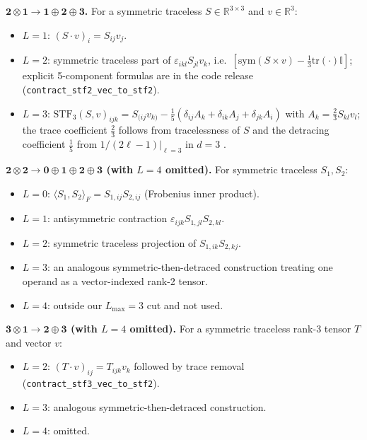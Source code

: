 \textbf{$\mathbf{2} \otimes \mathbf{1} \to \mathbf{1} \oplus \mathbf{2} \oplus \mathbf{3}$.}
For a symmetric traceless $S \in \mathbb{R}^{3\times 3}$ and $v \in \mathbb{R}^3$:
\begin{itemize}
    \item $L{=}1$: $(S \cdot v)_i = S_{ij}v_j$.
    \item $L{=}2$: symmetric traceless part of $\varepsilon_{ikl}S_{jl}v_k$, i.e.\ $[\mathrm{sym}(S\times v) - \tfrac{1}{3}\mathrm{tr}(\cdot)\mathbb{I}]$; explicit 5-component formulas are in the code release (\texttt{contract\_stf2\_vec\_to\_stf2}).
    \item $L{=}3$: $\mathrm{STF}_3(S, v)_{ijk} = S_{(ij}v_{k)} - \tfrac{1}{5}(\delta_{ij}A_k + \delta_{ik}A_j + \delta_{jk}A_i)$ with $A_k = \tfrac{2}{3}S_{kl}v_l$; the trace coefficient $\tfrac{2}{3}$ follows from tracelessness of $S$ and the detracing coefficient $\tfrac{1}{5}$ from $1/(2\ell{-}1)|_{\ell=3}$ in $d{=}3$ \citep{applequist1989traceless,thorne1980multipole}.
\end{itemize}

\textbf{$\mathbf{2} \otimes \mathbf{2} \to \mathbf{0} \oplus \mathbf{1} \oplus \mathbf{2} \oplus \mathbf{3}$ (with $L{=}4$ omitted).}
For symmetric traceless $S_1, S_2$:
\begin{itemize}
    \item $L{=}0$: $\langle S_1, S_2 \rangle_F = S_{1,ij}S_{2,ij}$ (Frobenius inner product).
    \item $L{=}1$: antisymmetric contraction $\varepsilon_{ijk}S_{1,jl}S_{2,kl}$.
    \item $L{=}2$: symmetric traceless projection of $S_{1,ik}S_{2,kj}$.
    \item $L{=}3$: an analogous symmetric-then-detraced construction treating one operand as a vector-indexed rank-2 tensor.
    \item $L{=}4$: outside our $L_{\max}{=}3$ cut and not used.
\end{itemize}

\textbf{$\mathbf{3} \otimes \mathbf{1} \to \mathbf{2} \oplus \mathbf{3}$ (with $L{=}4$ omitted).}
For a symmetric traceless rank-3 tensor $T$ and vector $v$:
\begin{itemize}
    \item $L{=}2$: $(T \cdot v)_{ij} = T_{ijk}v_k$ followed by trace removal (\texttt{contract\_stf3\_vec\_to\_stf2}).
    \item $L{=}3$: analogous symmetric-then-detraced construction.
    \item $L{=}4$: omitted.
\end{itemize}


